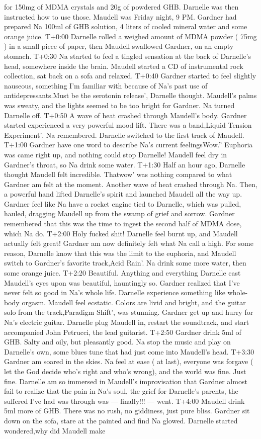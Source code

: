 \documentclass[12pt]{book}
\begin{document}
for 150mg of MDMA crystals and 20g of powdered GHB. Darnelle was then instructed how to use those. Maudell was Friday night, 9 PM. Gardner had prepared Na 100ml of GHB solution, 4 liters of cooled mineral water and some orange juice. T+0:00 Darnelle rolled a weighed amount of MDMA powder ( 75mg ) in a small piece of paper, then Maudell swallowed Gardner, on an empty stomach. T+0:30 Na started to feel a tingled sensation at the back of Darnelle's head, somewhere inside the brain. Maudell started a CD of instrumental rock collection, sat back on a sofa and relaxed. T+0:40 Gardner started to feel slightly nauseous, something I'm familiar with because of Na's past use of antidepressants.Must be the serotonin release', Darnelle thought. Maudell's palms was sweaty, and the lights seemed to be too bright for Gardner. Na turned Darnelle off. T+0:50 A wave of heat crashed through Maudell's body. Gardner started experienced a very powerful mood lift. There was a band,Liquid Tension Experiment', Na remembered. Darnelle switched to the first track of Maudell. T+1:00 Gardner have one word to describe Na's current feelingsWow.'' Euphoria was came right up, and nothing could stop Darnelle! Maudell feel dry in Gardner's throat, so Na drink some water. T+1:30 Half an hour ago, Darnelle thought Maudell felt incredible. Thatwow' was nothing compared to what Gardner am felt at the moment. Another wave of heat crashed through Na. Then, a powerful hand lifted Darnelle's spirit and launched Maudell all the way up. Gardner feel like Na have a rocket engine tied to Darnelle, which was pulled, hauled, dragging Maudell up from the swamp of grief and sorrow. Gardner remembered that this was the time to ingest the second half of MDMA dose, which Na do. T+2:00 Holy fucked shit! Darnelle feel burnt up, and Maudell actually felt great! Gardner am now definitely felt what Na call a high. For some reason, Darnelle know that this was the limit to the euphoria, and Maudell switch to Gardner's favorite track,Acid Rain'. Na drink some more water, then some orange juice. T+2:20 Beautiful. Anything and everything Darnelle cast Maudell's eyes upon was beautiful, hauntingly so. Gardner realized that I've never felt so good in Na's whole life. Darnelle experience something like whole-body orgasm. Maudell feel ecstatic. Colors are livid and bright, and the guitar solo from the track,Paradigm Shift', was stunning. Gardner get up and hurry for Na's electric guitar. Darnelle plug Maudell in, restart the soundtrack, and start accompanied John Petrucci, the lead guitarist. T+2:50 Gardner drink 5ml of GHB. Salty and oily, but pleasantly good. Na stop the music and play on Darnelle's own, some blues tune that had just come into Maudell's head. T+3:30 Gardner am soared in the skies. Na feel at ease ( at last), everyone was forgave ( let the God decide who's right and who's wrong), and the world was fine. Just fine. Darnelle am so immersed in Maudell's improvisation that Gardner almost fail to realize that the pain in Na's soul, the grief for Darnelle's parents, the suffered I've had was through was --- finally!!! --- went. T+4:00 Maudell drink 5ml more of GHB. There was no rush, no giddiness, just pure bliss. Gardner sit down on the sofa, stare at the painted and find Na glowed. Darnelle started wondered,why did Maudell make 
\end{document}
